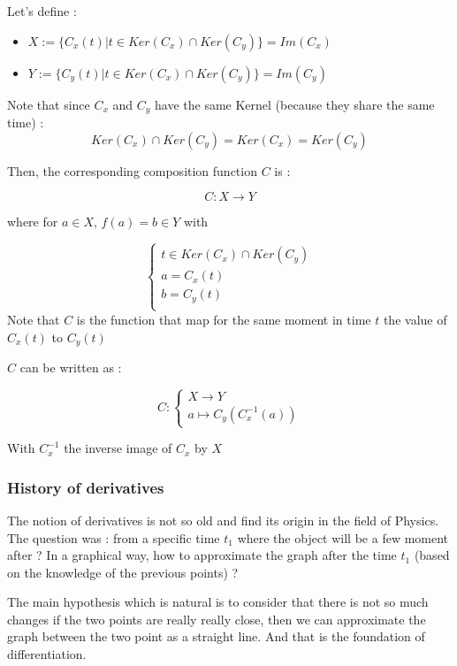 \documentclass[12pt]{article}
\begin{document}
Let's define :
\begin{itemize}
    \item[] $X := \{{ C_x(t) | t \in Ker(C_x) \cap Ker(C_y) \}} = Im(C_x)$
    \item[] $Y := \{{ C_y(t) | t \in Ker(C_x) \cap Ker(C_y) \}} = Im(C_y)$
\end{itemize}

Note that since $C_x$ and $C_y$ have the same Kernel (because they share the same time) :
$$
Ker(C_x) \cap Ker(C_y) = Ker(C_x) = Ker(C_y)
$$

Then, the corresponding composition function $C$ is :

$$
C: X \rightarrow Y
$$

where for $a \in X$, $f(a)=b \in Y$ with 

$$
\begin{cases}
t \in Ker(C_x) \cap Ker(C_y) \\
a = C_x(t) \\
b = C_y(t) \\
\end{cases}
$$
Note that $C$ is the function that map for the same moment in time $t$ the value of $C_x(t)$ to $C_y(t)$

\bigskip

$C$ can be written as :

$$
C:
\begin{cases}
X \rightarrow Y \\
a \mapsto C_y(C_x^{-1}(a))
\end{cases}
$$

With $C_x^{-1}$ the inverse image of $C_x$ by $X$

\begin{figure}[H]
 \centering
 
\end{figure}

\subsubsection{History of derivatives}

The notion of derivatives is not so old and find its origin in the field of Physics.
The question was : from a specific time $t_1$ where the object will be a few moment after ? In a graphical way, how to approximate the graph after the time $t_1$ (based on the knowledge of the previous points) ?

The main hypothesis which is natural is to consider that there is not so much changes if the two points are really really close, then we can approximate the graph between the two point as a straight line. And that is the foundation of differentiation.
\end{document}
